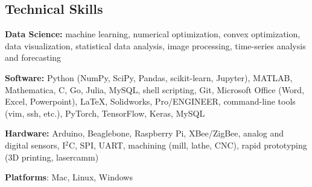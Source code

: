 \documentclass[10pt]{res}
\begin{document}
\begin{resume}
\section{Technical Skills}
\vspace{0.1in}

\textbf{Data Science:} machine learning, numerical optimization, convex
optimization, data visualization, statistical data analysis, image processing,
time-series analysis and forecasting

\textbf{Software:} Python (NumPy, SciPy, Pandas, scikit-learn, Jupyter),
MATLAB, Mathematica, C, Go, Julia, MySQL, shell scripting, Git, Microsoft Office
(Word, Excel, Powerpoint), LaTeX, Solidworks, Pro/ENGINEER, command-line tools
(vim, ssh, etc.), PyTorch, TensorFlow, Keras, MySQL

\textbf{Hardware:} Arduino, Beaglebone, Raspberry Pi, XBee/ZigBee, analog and
digital sensors, I$^2$C, SPI, UART, machining (mill, lathe, CNC), rapid
prototyping (3D printing, lasercamm)

\textbf{Platforms}: Mac, Linux, Windows

\end{resume}
\end{document}

